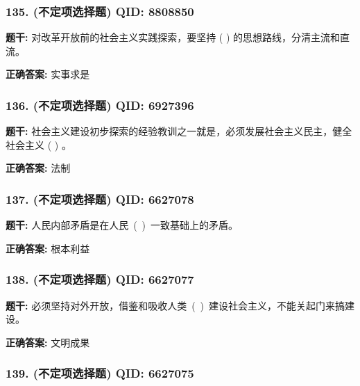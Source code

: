 \documentclass[12pt,UTF8]{ctexart}
\begin{document}
\subsubsection*{135. (不定项选择题) \small QID: 8808850}

\textbf{题干:}
对改革开放前的社会主义实践探索，要坚持 ( ) 的思想路线，分清主流和直流。

\textbf{正确答案:}
实事求是

\vspace{0.3em}\hrulefill\vspace{0.7em}

\subsubsection*{136. (不定项选择题) \small QID: 6927396}

\textbf{题干:}
社会主义建设初步探索的经验教训之一就是，必须发展社会主义民主，健全社会主义 ( ) 。

\textbf{正确答案:}
法制

\vspace{0.3em}\hrulefill\vspace{0.7em}

\subsubsection*{137. (不定项选择题) \small QID: 6627078}

\textbf{题干:}
人民内部矛盾是在人民 ( ) 一致基础上的矛盾。

\textbf{正确答案:}
根本利益

\vspace{0.3em}\hrulefill\vspace{0.7em}

\subsubsection*{138. (不定项选择题) \small QID: 6627077}

\textbf{题干:}
必须坚持对外开放，借鉴和吸收人类 ( ) 建设社会主义，不能关起门来搞建设。

\textbf{正确答案:}
文明成果

\vspace{0.3em}\hrulefill\vspace{0.7em}

\subsubsection*{139. (不定项选择题) \small QID: 6627075}
\end{document}
